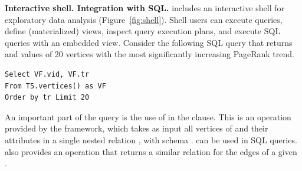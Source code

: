{\bf Interactive shell. Integration with SQL.}  \sys includes an
interactive shell for exploratory data analysis
(Figure~\ref{fig:shell}). Shell users can execute queries, define
(materialized) views, inspect query execution plans, and execute SQL
queries with an embedded \ql view. Consider the following SQL query
that returns  and  values of 20 vertices with the
most significantly increasing PageRank trend.

\begin{small}
\begin{verbatim}
Select VF.vid, VF.tr
From T5.vertices() as VF
Order by tr Limit 20
\end{verbatim}
\end{small}

An important part of the query is the use of  in
the  clause. This is an operation provided by the \sys
framework, which takes as input all vertices of  and their
attributes in a single nested relation , with schema
.  can be
used in SQL queries. \sys also provides an operation 
that returns a similar relation for the edges of a given \tg.



